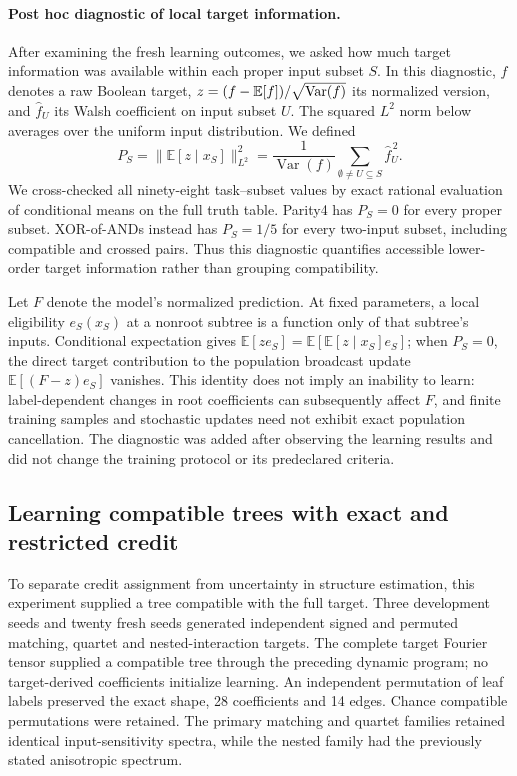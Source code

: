 \paragraph{Post hoc diagnostic of local target information.}
After examining the fresh learning outcomes, we asked how much target
information was available within each proper input subset $S$. In this
diagnostic, $f$ denotes a raw Boolean target, $z=(f-\mathbb{E}[f])/\sqrt{\operatorname{Var}(f)}$
its normalized version, and $\widehat f_U$ its Walsh coefficient on input
subset $U$. The squared $L^2$ norm below averages over the uniform input
distribution. We defined
\[
 P_S=\big\|\mathbb E[z\mid x_S]\big\|_{L^2}^2
 =\frac{1}{\operatorname{Var}(f)}
   \sum_{\emptyset\ne U\subseteq S}\widehat f_U^{\,2}.
\]
We cross-checked all ninety-eight task--subset values by exact rational
evaluation of conditional means on the full truth table. Parity4 has $P_S=0$
for every proper subset. XOR-of-ANDs instead has $P_S=1/5$ for every two-input
subset, including compatible and crossed pairs. Thus this diagnostic quantifies
accessible lower-order target information rather than grouping compatibility.

Let $F$ denote the model's normalized prediction. At fixed parameters, a
local eligibility $e_S(x_S)$ at a nonroot subtree is a
function only of that subtree's inputs. Conditional expectation gives
$\mathbb E[ze_S]=\mathbb E[\mathbb E[z\mid x_S]e_S]$; when $P_S=0$, the direct
target contribution to the population broadcast update
$\mathbb E[(F-z)e_S]$ vanishes. This identity does not imply an inability to
learn: label-dependent changes in root coefficients can subsequently affect
$F$, and finite training samples and stochastic updates need not exhibit exact
population cancellation. The diagnostic was added after observing the learning
results and did not change the training protocol or its predeclared criteria.
\subsection{Learning compatible trees with exact and restricted credit}
\label{note:morphology_credit_learning}

To separate credit assignment from uncertainty in structure estimation, this experiment supplied a tree compatible with the full target. Three development seeds and twenty fresh seeds generated independent signed and permuted matching, quartet and nested-interaction targets. The complete target Fourier tensor supplied a compatible tree through the preceding dynamic program; no target-derived coefficients initialize learning. An independent permutation of leaf labels preserved the exact shape, 28 coefficients and 14 edges. Chance compatible permutations were retained. The primary matching and quartet families retained identical input-sensitivity spectra, while the nested family had the previously stated anisotropic spectrum.

